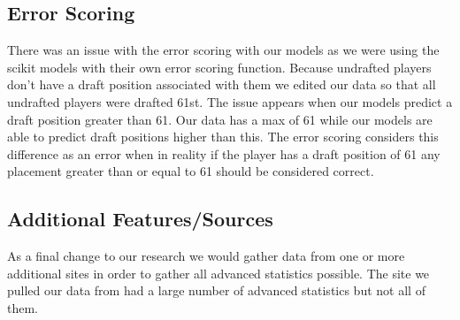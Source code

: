 \documentclass{article}
\begin{document}
\subsection{Error Scoring}

There was an issue with the error scoring with our models as we were using the
scikit models with their own error scoring function. Because undrafted players
don’t have a draft position associated with them we edited our data so that all
undrafted players were drafted 61st. The issue appears when our models predict a
draft position greater than 61. Our data has a max of 61 while our models are
able to predict draft positions higher than this. The error scoring considers
this difference as an error when in reality if the player has a draft position
of 61 any placement greater than or equal to 61 should be considered correct. 

\subsection{Additional Features/Sources}

As a final change to our research we would gather data from one or more
additional sites in order to gather all advanced statistics possible. The site
we pulled our data from had a large number of advanced statistics but not all of
them.
\end{document}
